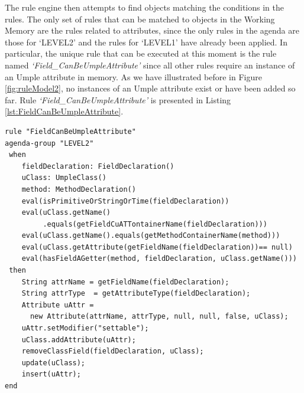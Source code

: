 The rule engine then attempts to find objects matching the conditions in the rules. The only set of rules that can be matched to objects in the Working Memory are the rules related to attributes, since the only rules in the agenda are those for `LEVEL2' and the rules for `LEVEL1' have already been applied. In particular, the unique rule
that can be executed at this moment is the rule named \textit{`Field\_CanBeUmpleAttribute'} since all other rules require an instance of an Umple attribute in memory. As we have illustrated before in Figure \ref{fig:ruleModel2}, no instances of an Umple attribute exist or have been added so far. Rule \textit{`Field\_CanBeUmpleAttribute'} is presented in Listing \ref{lst:FieldCanBeUmpleAttribute}.

\begin{lstlisting}[language={drools},label=lst:FieldCanBeUmpleAttribute, caption=Rule  FieldCanBeUmpleAttribute]
rule "FieldCanBeUmpleAttribute"
agenda-group "LEVEL2" 
 when
	fieldDeclaration: FieldDeclaration()
	uClass: UmpleClass()
	method: MethodDeclaration()
	eval(isPrimitiveOrStringOrTime(fieldDeclaration))				   
	eval(uClass.getName()
	     .equals(getFieldCuATTontainerName(fieldDeclaration)))
	eval(uClass.getName().equals(getMethodContainerName(method)))
	eval(uClass.getAttribute(getFieldName(fieldDeclaration))== null)
	eval(hasFieldAGetter(method, fieldDeclaration, uClass.getName()))
 then 
	String attrName = getFieldName(fieldDeclaration);
	String attrType  = getAttributeType(fieldDeclaration);
	Attribute uAttr = 
	  new Attribute(attrName, attrType, null, null, false, uClass);
	uAttr.setModifier("settable");
	uClass.addAttribute(uAttr);
	removeClassField(fieldDeclaration, uClass);
	update(uClass);    	
	insert(uAttr);
end
\end{lstlisting}

